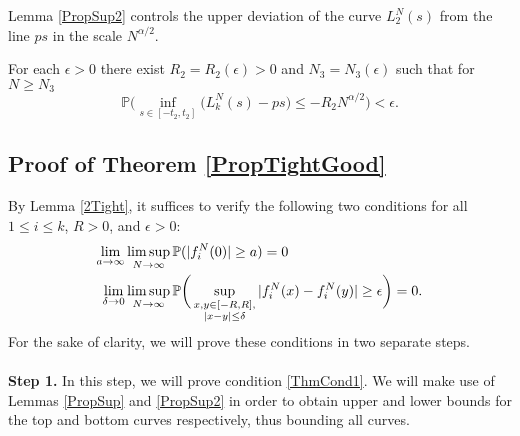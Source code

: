 Lemma \ref{PropSup2} controls the upper deviation of the curve $L^N_2(s)$ from the line $ps$ in the scale $N^{\alpha/2}$.
\begin{lemma}\label{PropSup2} For each $\epsilon > 0$ there exist $R_2=R_2( \epsilon) > 0$ and $N_3=N_3(\epsilon)$ such that for $N \geq N_3$
$$\mathbb{P}\Big( \inf_{s \in [ -t_2, t_2 ]}\big(L^N_k(s) - p s \big) \leq - R_2N^{\alpha/2} \Big) < \epsilon.$$
\end{lemma}




%
\subsection{Proof of Theorem \ref{PropTightGood} }\label{Section4.2}
	
	By Lemma \ref{2Tight}, it suffices to verify the following two conditions for all $1\leq i\leq k$, $R>0$, and $\epsilon>0$:
	\begin{align}
	\lim_{a\to\infty} &\limsup_{N\to\infty} \mathbb{P}(|f^N_i(0)|\geq a) = 0 \label{ThmCond1}\\
	\lim_{\delta\to 0} &\limsup_{N\to\infty} \mathbb{P}\bigg(\sup_{\substack{x,y\in [-R,R], \\ |x-y|\leq\delta}} |f^N_i(x) - f^N_i(y)| \geq \epsilon\bigg)= 0. \label{ThmCond2}
	\end{align}
	For the sake of clarity, we will prove these conditions in two separate steps.
	\\\\\noindent \textbf{Step 1.} In this step, we will prove condition \eqref{ThmCond1}. We will make use of Lemmas \ref{PropSup} and \ref{PropSup2} in order to obtain upper and lower bounds for the top and bottom curves respectively, thus bounding all curves.
	
